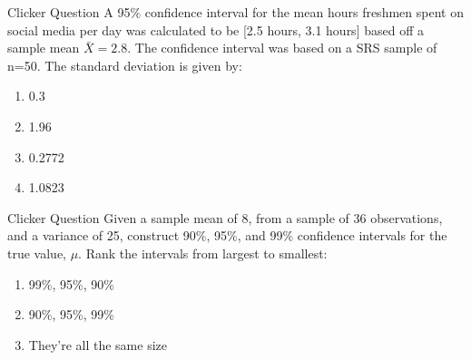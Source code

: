 \documentclass{beamer}
\begin{document}
\begin{frame}{Clicker Question}
	A 95\% confidence interval for the mean hours freshmen spent on social media per day was calculated to be [2.5 hours, 3.1 hours] based off a sample mean $\bar{X}=2.8$. The confidence interval was based on a SRS sample of n=50. The standard deviation is given by:
	
	\begin{enumerate}[label=(\alph*)]
		\item 0.3
		\item 1.96
		\item 0.2772
		\item 1.0823
	\end{enumerate}
\end{frame}



\begin{frame}{Clicker Question}
	Given a sample mean of 8, from a sample of 36 observations, and a variance of 25, construct 90\%, 95\%, and 99\% confidence intervals for the true value, $\mu$. Rank the intervals from largest to smallest:
	\begin{enumerate}[label=(\alph*)]
		\item 99\%, 95\%, 90\%
		\item 90\%, 95\%, 99\%
		\item They're all the same size
	\end{enumerate}
\end{frame}
\end{document}
